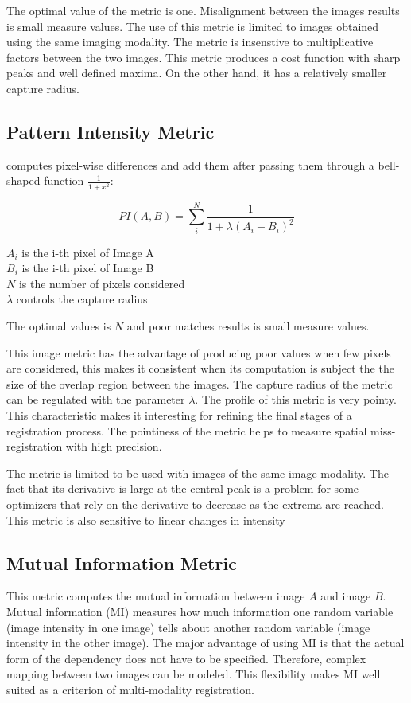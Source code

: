 The optimal value of the metric is one. Misalignment between the images results
is small measure values. The use of this metric is limited to images obtained
using the same imaging modality. The metric is insenstive to multiplicative
factors between the two images. This metric produces a cost function with sharp
peaks and well defined maxima. On the other hand, it has a relatively smaller
capture radius.

\subsection{Pattern Intensity Metric}
\label{sec:PatternIntensityMetric}
 computes pixel-wise differences and add them 
after passing them through a bell-shaped function $\frac{1}{1+x^2}$:

\begin{equation}
PI(A,B) =  \sum_i^N \frac{ 1 }{ 1 + \lambda \left( A_i - B_i \right) ^ 2 }
\end{equation}
\begin{center}
$A_i$ is the i-th pixel of Image A \\
$B_i$ is the i-th pixel of Image B \\
$N$ is the number of pixels considered \\
$\lambda$ controls the capture radius
\end{center}

The optimal values is $N$ and poor matches results is small measure values.

This image metric has the advantage of producing poor values when few pixels
are considered, this makes it consistent when its computation is subject the
the size of the overlap region between the images. The capture radius of the
metric can be regulated with the parameter $\lambda$.  The profile of this
metric is very pointy. This characteristic makes it interesting for refining
the final stages of a registration process.  The pointiness of the metric helps
to measure spatial miss-registration with high precision.

The metric is limited to be used with images of the same image modality.  The
fact that its derivative is large at the central peak is a problem for some
optimizers that rely on the derivative to decrease as the extrema are reached.
This metric is also sensitive to linear changes in intensity


\subsection{Mutual Information Metric}
\label{sec:MutualInformationMetric}
This metric computes the mutual information between image $A$ and image $B$.
Mutual information (MI) measures how much information one random variable
(image intensity in one image) tells about another random variable 
(image intensity in the other image). The major advantage of using
MI is that the actual form of the dependency does not have to be specified. 
Therefore, complex mapping between two images can be modeled. 
This flexibility makes MI well suited as a criterion of multi-modality
registration.

